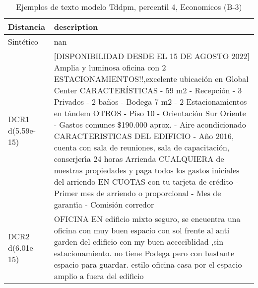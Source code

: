\begin{table}[H]
\centering
\fontsize{10}{14}\selectfont
\caption{Ejemplos de texto modelo Tddpm, percentil 4, Economicos (B-3)}
\label{table-example-economicos-b-3-tddpm_mlp-4p-text}
\begin{tabular}{|l|m{35em}|}
\hline
\rowcolor[gray]{0.8}
Distancia & description \\
\hline Sintético & nan \\
\hline DCR1 d(5.59e-15) & [DISPONIBILIDAD DESDE EL 15 DE AGOSTO 2022]  Amplia y luminosa oficina con 2 ESTACIONAMIENTOS!!,excelente ubicaci\'on en Global Center  CARACTER\'ISTICAS - 59 m2 - Recepci\'on  - 3 Privados - 2 ba\~nos - Bodega 7 m2 - 2 Estacionamientos en t\'andem  OTROS - Piso 10 - Orientaci\'on Sur Oriente - Gastos comunes \$190.000 aprox. - Aire acondicionado  CARACTERISTICAS DEL EDIFICIO - A\~no 2016, cuenta con sala de reuniones, sala de capacitaci\'on, conserjer{\'\i}a 24 horas  Arrienda CUALQUIERA de nuestras propiedades y paga todos los gastos iniciales del arriendo EN CUOTAS con tu tarjeta de cr\'edito - Primer mes de arriendo o proporcional - Mes de garant{\'\i}a - Comisi\'on corredor \\
\hline DCR2 d(6.01e-15) & OFICINA EN edificio mixto seguro, se encuentra una oficina con muy buen espacio con sol frente al anti garden del edificio con my buen acceciblidad  ,sin estacionamiento.  no tiene Podega pero con bastante espacio para guardar. estilo oficina casa por el espacio amplio a fuera del edificio \\
\hline
\end{tabular}
\end{table}

